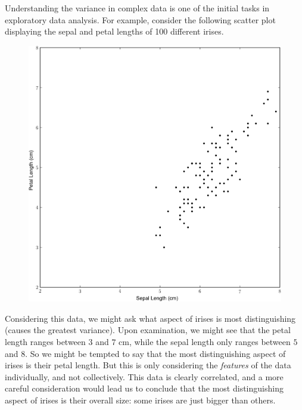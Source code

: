 
Understanding the variance in complex data is one of the initial tasks in exploratory data analysis. For example, consider the following scatter plot displaying the sepal and petal lengths of 100 different irises.
\begin{figure}[h]
\centering
\includegraphics[width=\textwidth]{iris0.pdf}
\end{figure}
Considering this data, we might ask what aspect of irises is most distinguishing (causes the greatest variance). Upon examination, we might see that the petal length ranges between $3$ and $7$ cm, while the sepal length only ranges between $5$ and $8$. So we might be tempted to say that the most distinguishing aspect of irises is their petal length.
But this is only considering the \emph{features} of the data individually, and not collectively. This data is clearly correlated, and a more careful consideration would lead us to conclude that the most distinguishing aspect of irises is their overall size: some irises are just bigger than others.
